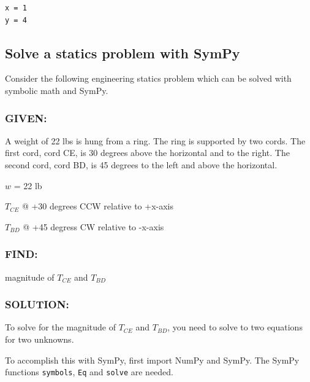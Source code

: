 \documentclass{book}
\begin{document}
    \begin{Verbatim}[commandchars=\\\{\}]
x = 1
y = 4

    \end{Verbatim}


    
        \subsection{Solve a statics problem with
SymPy}\label{solve-a-statics-problem-with-sympy}
    




    
        Consider the following engineering statics problem which can be solved
with symbolic math and SymPy.

\subsubsection{GIVEN:}\label{given}

A weight of 22 lbs is hung from a ring. The ring is supported by two
cords. The first cord, cord CE, is 30 degrees above the horizontal and
to the right. The second cord, cord BD, is 45 degrees to the left and
above the horizontal.

\(w\) = 22 lb

\(T_{CE}\) @ +30 degrees CCW relative to +x-axis

\(T_{BD}\) @ +45 degress CW relative to -x-axis

\subsubsection{FIND:}\label{find}

magnitude of \(T_{CE}\) and \(T_{BD}\)
    




    
        \subsubsection{SOLUTION:}\label{solution}

To solve for the magnitude of \(T_{CE}\) and \(T_{BD}\), you need to
solve to two equations for two unknowns.

To accomplish this with SymPy, first import NumPy and SymPy. The SymPy
functions \lstinline!symbols!, \lstinline!Eq! and \lstinline!solve! are
needed.
    
\end{document}
